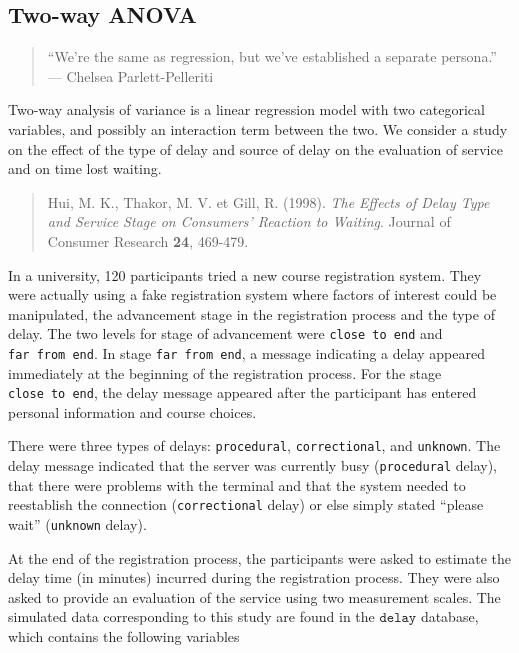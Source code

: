 \documentclass[
  11pt,
  letterpaper,
]{book}
\theoremstyle{definition}
\theoremstyle{definition}
\theoremstyle{definition}
\theoremstyle{remark}
\begin{document}
\hypertarget{two-way-anova}{%
\subsection{Two-way ANOVA}\label{two-way-anova}}

\begin{quote}
``We're the same as regression, but we've established a separate persona.'' --- Chelsea Parlett-Pelleriti
\end{quote}

Two-way analysis of variance is a linear regression model with two categorical variables, and possibly an interaction term between the two. We consider a study on the effect of the type of delay and source of delay on the evaluation of service and on time lost waiting.

\begin{quote}
Hui, M. K., Thakor, M. V. et Gill, R. (1998). \emph{The Effects of Delay Type and Service Stage on Consumers' Reaction to Waiting}. Journal of Consumer Research \textbf{24}, 469-479.
\end{quote}

In a university, 120 participants tried a new course registration system. They were actually using a fake registration system where factors of interest could be manipulated, the advancement stage in the registration process and the type of delay. The two levels for stage of advancement were \texttt{close\ to\ end} and \texttt{far\ from\ end}. In stage \texttt{far\ from\ end}, a message indicating a delay appeared immediately at the beginning of the registration process. For the stage \texttt{close\ to\ end}, the delay message appeared after the participant has entered personal information and course choices.

There were three types of delays: \texttt{procedural}, \texttt{correctional}, and \texttt{unknown}. The delay message indicated that the server was currently busy (\texttt{procedural} delay), that there were problems with the terminal and that the system needed to reestablish the connection (\texttt{correctional} delay) or else simply stated ``please wait'' (\texttt{unknown} delay).

At the end of the registration process, the participants were asked to estimate the delay time (in minutes) incurred during the registration process. They were also asked to provide an evaluation of the service using two measurement scales. The simulated data corresponding to this study are found in the \(\texttt{delay}\) database, which contains the following variables
\end{document}
